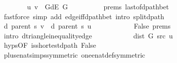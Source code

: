 \begin{isabellebody}
\ \ \ \ \ \ \isamarkupfalse%
\ {\isachardoublequoteopen}{\isacharparenleft}{\kern0pt}u{\isacharcomma}{\kern0pt}\ v{\isacharparenright}{\kern0pt}\ {\isasymin}\ G{\isachardot}{\kern0pt}dE\ G{\isachardoublequoteclose}\isanewline
\ \ \ \ \ \ \ \ \isamarkupfalse%
\ {\isachardoublequoteopen}{}{\isachardot}{\kern0pt}prems{\isachardoublequoteclose}{\isacharparenleft}{\kern0pt}{}{\isacharparenright}{\kern0pt}\ last{\isacharunderscore}{\kern0pt}of{\isacharunderscore}{\kern0pt}dpath{\isacharunderscore}{\kern0pt}bet\isanewline
\ \ \ \ \ \ \ \ \isamarkupfalse%
\ {\isacharparenleft}{\kern0pt}fastforce\ simp\ add{\isacharcolon}{\kern0pt}\ edge{\isacharunderscore}{\kern0pt}iff{\isacharunderscore}{\kern0pt}dpath{\isacharunderscore}{\kern0pt}bet\ intro{\isacharcolon}{\kern0pt}\ split{\isacharunderscore}{\kern0pt}dpath{\isacharparenright}{\kern0pt}\isanewline
\ \ \ \ \ \ \isamarkupfalse%
\ {\isachardoublequoteopen}d\ {\isacharparenleft}{\kern0pt}parent\ s{\isacharparenright}{\kern0pt}\ v\ {\isasymle}\ d\ {\isacharparenleft}{\kern0pt}parent\ s{\isacharparenright}{\kern0pt}\ u\ {\isacharplus}{\kern0pt}\ {}{\isachardoublequoteclose}\isanewline
\ \ \ \ \ \ \ \ \isamarkupfalse%
\ False\ {\isachardoublequoteopen}{}{\isachardot}{\kern0pt}prems{\isachardoublequoteclose}{\isacharparenleft}{\kern0pt}{}{\isacharparenright}{\kern0pt}\isanewline
\ \ \ \ \ \ \ \ \isamarkupfalse%
\ {\isacharparenleft}{\kern0pt}intro\ d{\isacharunderscore}{\kern0pt}triangle{\isacharunderscore}{\kern0pt}inequality{\isacharunderscore}{\kern0pt}edge{\isacharparenright}{\kern0pt}\isanewline
\ \ \ \ \ \ \isamarkupfalse%
\ \isamarkupfalse%
\ {\isachardoublequoteopen}{\isachardot}{\kern0pt}{\isachardot}{\kern0pt}{\isachardot}{\kern0pt}\ {\isasymle}\ dist\ G\ src\ u\ {\isacharplus}{\kern0pt}\ {}{\isachardoublequoteclose}\isanewline
\ \ \ \ \ \ \ \ \isamarkupfalse%
\ {\isachardoublequoteopen}{}{\isachardot}{\kern0pt}hyps{\isachardoublequoteclose}{\isacharbrackleft}{\kern0pt}OF\ is{\isacharunderscore}{\kern0pt}shortest{\isacharunderscore}{\kern0pt}dpath\ False{\isacharbrackright}{\kern0pt}\isanewline
\ \ \ \ \ \ \ \ \isamarkupfalse%
\ plus{\isacharunderscore}{\kern0pt}enat{\isacharunderscore}{\kern0pt}simps{\isacharparenleft}{\kern0pt}{}{\isacharparenright}{\kern0pt}{\isacharbrackleft}{\kern0pt}symmetric{\isacharbrackright}{\kern0pt}\ one{\isacharunderscore}{\kern0pt}enat{\isacharunderscore}{\kern0pt}def{\isacharbrackleft}{\kern0pt}symmetric{\isacharbrackright}{\kern0pt}\isanewline

\end{isabellebody}
